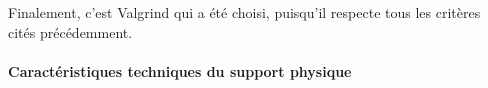 \documentclass[10pt]{report}
\begin{document}
Finalement, c'est Valgrind qui a été choisi, puisqu'il respecte tous les critères cités précédemment.
 \\
 
 		\paragraph{Caractéristiques techniques du support physique}~\par
 	
 		
%		
\end{document}
